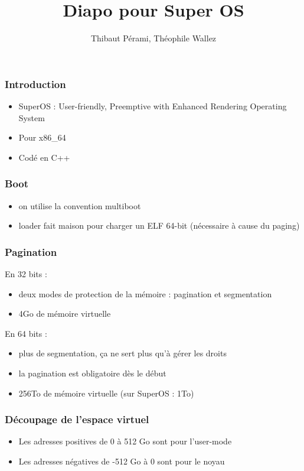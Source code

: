 \documentclass{beamer}
\title{Diapo pour Super OS}
\author{Thibaut Pérami, Théophile Wallez}
\begin{document}
\frame{\titlepage}

\begin{frame}
    \frametitle{Introduction}
    \begin{itemize}
        \item SuperOS : User-friendly, Preemptive with Enhanced Rendering Operating System
        \item Pour x86\_64
        \item Codé en C++
    \end{itemize}
\end{frame}

\begin{frame}
    \frametitle{Boot}
    \begin{itemize}
        \item on utilise la convention multiboot
        \item loader fait maison pour charger un ELF 64-bit (nécessaire à cause du paging)
    \end{itemize}
\end{frame}

\begin{frame}
    \frametitle{Pagination}
    En 32 bits :
    \begin{itemize}
        \item deux modes de protection de la mémoire : pagination et segmentation
        \item 4Go de mémoire virtuelle
    \end{itemize}
    En 64 bits :
    \begin{itemize}
        \item plus de segmentation, ça ne sert plus qu'à gérer les droits
        \item la pagination est obligatoire dès le début
        \item 256To de mémoire virtuelle (sur SuperOS : 1To)
    \end{itemize}
\end{frame}

\begin{frame}
    \frametitle{Découpage de l'espace virtuel}
    \begin{itemize}
        \item Les adresses positives de 0 à 512 Go sont pour l'user-mode
        \item Les adresses négatives de -512 Go à 0 sont pour le noyau
    \end{itemize}
\end{frame}
\end{document}
